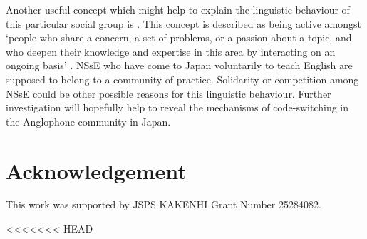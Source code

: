\documentclass[output=paper]{LSP/langsci}
\begin{document}
Another useful concept which might help to explain the linguistic behaviour of this particular social group is  \citep{eckert_adolescent_1988}. This concept is described as being active amongst ‘people who share a concern, a set of problems, or a passion about a topic, and who deepen their knowledge and expertise in this area by interacting on an ongoing basis’ \citep[4]{wenger_cultivating_2002}. NSsE who have come to Japan voluntarily to teach English are supposed to belong to a community of practice. Solidarity or competition among NSsE could be other possible reasons for this linguistic behaviour. Further investigation will hopefully help to reveal the mechanisms of code-switching in the Anglophone community in Japan.

\section*{Acknowledgement}
This work was supported by JSPS KAKENHI Grant Number 25284082.

\printbibliography[heading=subbibliography,notkeyword=this]
<<<<<<< HEAD
\end{document}
